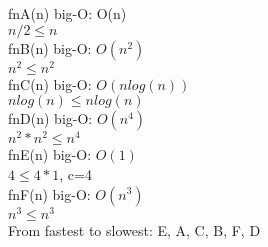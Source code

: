 \documentclass{article}
\begin{document}
    \vspace{1.5mm}
    \noindent fnA(n) big-O: O(n)
    \\ $n/2 \leqslant n$
    \vspace{1.5mm}
    \\ fnB(n) big-O: $O(n^2)$
    \\ $n^2 \leqslant n^2$
    \vspace{1.5mm}
    \\ fnC(n) big-O: $O(nlog(n))$
    \\ $nlog(n) \leqslant nlog(n)$
    \vspace{1.5mm}
    \\ fnD(n) big-O: $O(n^4)$
    \\ $n^2*n^2 \leqslant n^4$
    \vspace{1.5mm}
    \\ fnE(n) big-O: $O(1)$
    \\ $4 \leqslant 4*1$, c=4
    \vspace{1.5mm}
    \\ fnF(n) big-O: $O(n^3)$
    \\ $n^3 \leqslant n^3$
    \vspace{1.5mm}
    \\ From fastest to slowest: E, A, C, B, F, D
    
\end{document}
